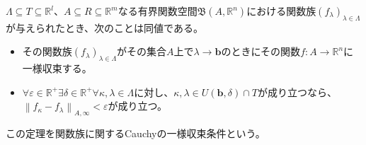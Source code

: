 \documentclass[dvipdfmx]{jsarticle}
\begin{document}
\begin{thm}[関数族に関するCauchyの一様収束条件]\label{4.1.11.15}
$\varLambda \subseteq T \subseteq \mathbb{R}^{l}$、$A \subseteq R \subseteq \mathbb{R}^{m}$なる有界関数空間$\mathfrak{B}\left( A,\mathbb{R}^{n} \right)$における関数族$\left( f_{\lambda} \right)_{\lambda \in \varLambda}$が与えられたとき、次のことは同値である。
\begin{itemize}
\item
  その関数族$\left( f_{\lambda} \right)_{\lambda \in \varLambda}$がその集合$A$上で$\lambda \rightarrow \mathbf{b}$のときにその関数$f:A \rightarrow \mathbb{R}^{n}$に一様収束する。
\item
  $\forall\varepsilon \in \mathbb{R}^{+}\exists\delta \in \mathbb{R}^{+}\forall\kappa,\lambda \in \varLambda$に対し、$\kappa,\lambda \in U\left( \mathbf{b},\delta \right) \cap T$が成り立つなら、$\left\| f_{\kappa} - f_{\lambda} \right\|_{A,\infty} < \varepsilon$が成り立つ。
\end{itemize}
この定理を関数族に関するCauchyの一様収束条件という。
\end{thm}
\end{document}

